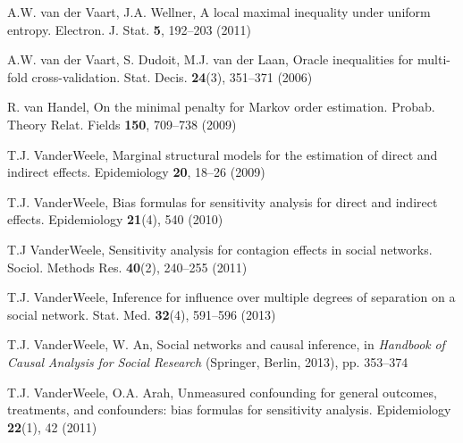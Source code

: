 \begin{list}{}{\setlength{\leftmargin}{2.1em}\setlength{\labelwidth}{0pt}
  \setlength{\labelsep}{0pt}\setlength{\itemindent}{-2.1em}
  \setlength{\parsep}{0pt}\setlength{\itemsep}{2pt}\setlength{\topsep}{0pt}}
\item\label{refentry:REF443}A.W. van der Vaart, J.A. Wellner, A local maximal inequality under uniform entropy. Electron. J. Stat. \textbf{5}, 192--203 (2011)\label{refend:REF443}
\item\label{refentry:REF444}A.W. van der Vaart, S. Dudoit, M.J. van der Laan, Oracle inequalities for multi-fold cross-validation. Stat. Decis. \textbf{24}(3), 351--371 (2006)\label{refend:REF444}
\item\label{refentry:REF445}R. van Handel, On the minimal penalty for Markov order estimation. Probab. Theory Relat. Fields \textbf{150}, 709--738 (2009)\label{refend:REF445}
\item\label{refentry:REF446}T.J. VanderWeele, Marginal structural models for the estimation of direct and indirect effects. Epidemiology \textbf{20}, 18--26 (2009)\label{refend:REF446}
\item\label{refentry:REF447}T.J. VanderWeele, Bias formulas for sensitivity analysis for direct and indirect effects. Epidemiology \textbf{21}(4), 540 (2010)\label{refend:REF447}
\item\label{refentry:REF448}T.J VanderWeele, Sensitivity analysis for contagion effects in social networks. Sociol. Methods Res. \textbf{40}(2), 240--255 (2011)\label{refend:REF448}
\item\label{refentry:REF449}T.J. VanderWeele, Inference for influence over multiple degrees of separation on a social network. Stat. Med. \textbf{32}(4), 591--596 (2013)\label{refend:REF449}
\item\label{refentry:REF450}T.J. VanderWeele, W. An, Social networks and causal inference, in \textit{Handbook} \textit{of} \textit{Causal} \textit{Analysis} \textit{for} \textit{Social} \textit{Research} (Springer, Berlin, 2013), pp. 353--374\label{refend:REF450}
\item\label{refentry:REF451}T.J. VanderWeele, O.A. Arah, Unmeasured confounding for general outcomes, treatments, and confounders: bias formulas for sensitivity analysis. Epidemiology \textbf{22}(1), 42 (2011)\label{refend:REF451}

\end{list}
